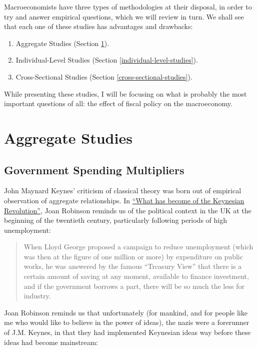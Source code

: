 \documentclass[]{book}
\providecommand{\tightlist}{%
  \setlength{\itemsep}{0pt}\setlength{\parskip}{0pt}}
\begin{document}
Macroeconomists have three types of methodologies at their disposal, in
order to try and answer empirical questions, which we will review in
turn. We shall see that each one of these studies has advantages and
drawbacks:

\begin{enumerate}
\def\labelenumi{\arabic{enumi}.}
\tightlist
\item
  Aggregate Studies (Section \ref{aggregate-studies}).
\item
  Individual-Level Studies (Section \ref{individual-level-studies}).
\item
  Cross-Sectional Studies (Section \ref{cross-sectional-studies}).
\end{enumerate}

While presenting these studies, I will be focusing on what is probably
the most important questions of all: the effect of fiscal policy on the
macroeconomy.

\section{Aggregate Studies}\label{aggregate-studies}

\subsection{Government Spending
Multipliers}\label{government-spending-multipliers}

John Maynard Keynes' criticism of classical theory was born out of
empirical observation of aggregate relationships. In
\href{bib/Robinson1974.pdf}{``What has become of the Keynesian
Revolution''}, Joan Robinson reminds us of the political context in the
UK at the beginning of the twentieth century, particularly following
periods of high unemployment:

\begin{quote}
When Lloyd George proposed a campaign to reduce unemployment (which was
then at the figure of one million or more) by expenditure on public
works, he was answered by the famous ``Trcasury View'' that there is a
certain amount of saving at any moment, available to finance investment,
and if the government borrows a part, there will be so much the less for
industry.
\end{quote}

Joan Robinson reminds us that unfortunately (for mankind, and for people
like me who would like to believe in the power of ideas), the nazis were
a forerunner of J.M. Keynes, in that they had implemented Keynesian
ideas way before these ideas had become mainstream:
\end{document}
